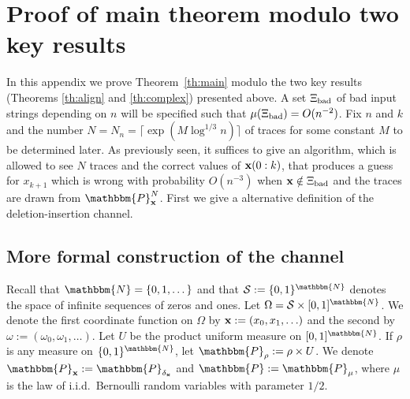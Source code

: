 \documentclass[final,12pt]{colt2018} %
\newcommand{\N}{\mathbbm{N}}
\renewcommand{\P}{\mathbbm{P}}
\newcommand{\1}{\mathbf{1}}
\def\cS{\mathcal{S}}
\def\cS{\mathcal{S}}
\def\x{{\bf x}}
\def\bad{{\Xi_{\rm bad}}}
\begin{document}

\appendix

\section{Proof of main theorem modulo two key results}
\label{sec:proofmainthm}

In this appendix we prove Theorem~\ref{th:main} modulo the two key results (Theorems \ref{th:align} and \ref{th:complex}) presented above.
A set $\bad$ of bad input strings depending on $n$ will be specified such that
$\mu (\bad) = O(n^{-2})$.  Fix $n$ and $k$ and the number
$N = N_n = \lceil\exp (M \log^{1/3} n)\rceil$ of traces for some constant $M$ to be determined later. As previously seen,
it suffices to give an algorithm, which is allowed to see $N$ traces
and the correct values of $\x(0:k)$, that produces a guess for $x_{k+1}$
which is wrong with probability $O(n^{-3})$ when $\x \notin \bad$
and the traces are drawn from $\P_{\x}^N$. First we give a alternative definition of the deletion-insertion channel.


\subsection{More formal construction of the channel}

Recall that $\N=\{0,1,\dots \}$ and that $\cS := \{ 0 , 1 \}^\N$ denotes
the space of infinite sequences of zeros and ones.  Let
$\Omega = \cS \times [0,1]^{\N}$.  We denote
the first coordinate function on $\Omega$ by $\x := (x_0 , x_1 , \ldots)$
and the second by $\omega := (\omega_0 , \omega_1 , \ldots)$.
Let $U$ be the product uniform measure on $[0,1]^\N$.  If $\rho$
is any measure on $\{ 0 , 1 \}^\N$, let $\P_\rho := \rho \times U$.
We denote $\P_\x := \P_{\delta_\x}$ and $\P := \P_\mu$, where $\mu$
is the law of i.i.d.\ Bernoulli random variables with parameter $1/2$.
\end{document}
